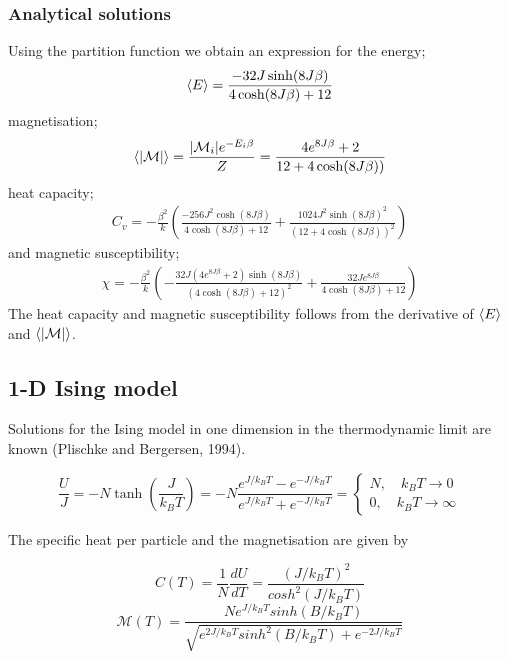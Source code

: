 \documentclass[11pt,a4paper,draft]{article}
\numberwithin{equation}{section}
\newcommand{\magM}{\mathcal{M}}
\begin{document}
\subsubsection{Analytical solutions}
Using the partition function we obtain an expression for the energy;
\begin{gather}
\expval{E} = \frac{-32J\sinh(8J\beta)}{4\cosh(8J\beta)+12}
\end{gather}
magnetisation;
\begin{gather}
\expval{\abs{\magM}} = \frac{\abs{\magM_i}e^{-E_i\beta}}{Z}
= \frac{4e^{8J\beta} + 2}{12+4\cosh(8J\beta))}
\end{gather}
heat capacity;
\begin{gather}
C_v = -\frac{\beta^2}{k}\left(\frac{-256J^2\cosh(8J\beta)}{4\cosh(8J\beta) + 12}
 + \frac{1024J^2\sinh(8J\beta)^2}{(12+4\cosh(8J\beta))^2}\right)
\end{gather}
and magnetic susceptibility;
\begin{gather}
\chi = -\frac{\beta^2}{k}\left(- \frac{32 J \left(4 e^{8 J \beta} + 2\right) \sinh{\left (8 J \beta \right )}}{
\left(4 \cosh{\left (8 J \beta \right )} + 12\right)^{2}} 
+ \frac{32 J e^{8 J \beta}}{4 \cosh(8 J \beta) + 12}\right)
\end{gather}
The heat capacity and magnetic susceptibility follows from the derivative 
of $\expval{E}$ and $\expval{\abs{\magM}}$.

\subsection{1-D Ising model}
Solutions for the Ising model in one dimension in the 
thermodynamic limit are known (Plischke and Bergersen, 1994). 

\begin{equation}
\frac{U}{J} = -N \tanh \left( \frac{J}{k_B T} \right) = -N \frac{e^{J/k_B T}-e^{-J/k_B T} }{e^{J/k_B T}+ e^{-J/k_B T} } =  \begin{cases} N, \quad k_B T \to 0 \\ 0, \quad  k_B T \to \infty \end{cases}
\end{equation}

The specific heat per particle and the magnetisation are given by 

\begin{equation}
C(T) = \frac{1}{N} \frac{dU}{dT} = \frac{(J/k_B T)^2}{cosh^2 (J/k_B T)}
\end{equation}
\begin{equation}
\magM(T) = \frac{N e^{J / k_B T} sinh(B/k_B T) }{ \sqrt{ e^{2J/k_B T} sinh^2 (B/k_B T) + e^{-2J/ k_B T}  } }
\end{equation}
\end{document}
